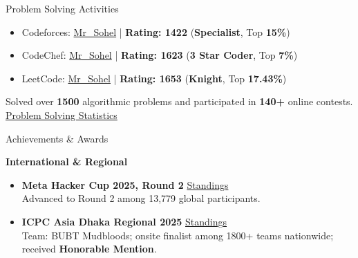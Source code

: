 \documentclass{resume}
\begin{document}
\noindent
\begin{minipage}[t]{0.46\textwidth}
\vspace{0pt}


\begin{rSection}{Problem Solving Activities}

\begin{itemize}
    \item Codeforces: \href{https://codeforces.com/profile/mr_sohel}{Mr\_Sohel} | {\bf Rating: 1422} ({\bf Specialist}, Top {\bf 15\%})
    \item CodeChef: \href{https://www.codechef.com/users/mr_sohel}{Mr\_Sohel} | {\bf Rating: 1623} ({\bf 3 Star Coder}, Top {\bf 7\%})
    \item LeetCode: \href{https://leetcode.com/mr_sohel/}{Mr\_Sohel} | {\bf Rating: 1653} ({\bf Knight}, Top {\bf 17.43\%})
\end{itemize}

\vspace{6pt}
Solved over {\bf 1500} algorithmic problems and participated in {\bf 140+} online contests.
\newline
\href{https://codolio.com/profile/mr_sohel}{Problem Solving Statistics}

\end{rSection}

\begin{rSection}{Achievements \& Awards}
{\small
{\bf International \& Regional}
\begin{itemize}[leftmargin=1.5em, itemsep=2pt, parsep=0pt, topsep=2pt]
    \item \textbf{Meta Hacker Cup 2025, Round 2} \hfill \href{https://www.facebook.com/codingcompetitions/hacker-cup/2025/certificate/24835990539367561}{Standings} \\
    Advanced to Round 2 among 13,779 global participants.

    \item \textbf{ICPC Asia Dhaka Regional 2025} \hfill \href{https://bapsoj.org/contests/icpc-dhaka-onsite-2025/standings}{Standings} \\
    Team: BUBT Mudbloods; onsite finalist among 1800+ teams nationwide; received \textbf{Honorable Mention}.


\end{itemize}}
\end{rSection}
\end{minipage}
\end{document}
